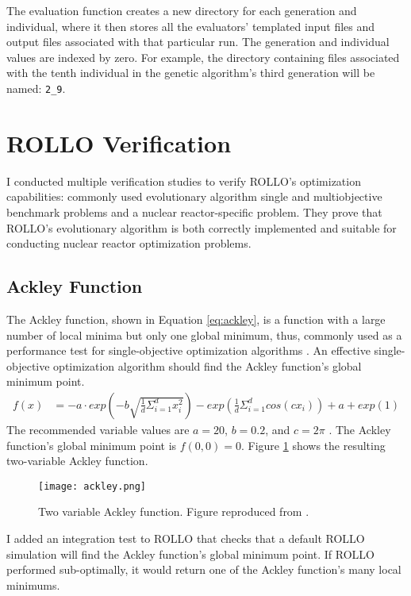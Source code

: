 The evaluation function creates a new directory for each generation and individual, 
where it then stores all the evaluators' templated input files and output files 
associated with that particular run. 
The generation and individual values are indexed by zero. 
For example, the directory containing files associated with the tenth individual in 
the genetic algorithm's third generation will be named: 
\texttt{2\_9}.


\section{ROLLO Verification}
\label{sec:rollo-verification}
I conducted multiple verification studies to verify \gls{ROLLO}'s optimization capabilities: 
commonly used evolutionary algorithm single and multiobjective benchmark problems and 
a nuclear reactor-specific problem. 
They prove that \gls{ROLLO}'s evolutionary algorithm is both correctly implemented 
and suitable for conducting nuclear reactor optimization problems. 

\subsection{Ackley Function}
The Ackley function, shown in Equation \ref{eq:ackley}, is a function with a 
large number of local minima but only one global minimum, thus, commonly used as a 
performance test for single-objective optimization algorithms 
\cite{ackley_connectionist_2012}. 
An effective single-objective optimization algorithm should find the Ackley function's 
global minimum point.  
\begin{align}
    \label{eq:ackley}
    f(x) &= -a \cdot exp \left(-b\sqrt{\frac{1}{d}\Sigma_{i=1}^dx_i^2}\right) - 
    exp \left(\frac{1}{d}\Sigma_{i=1}^d cos(cx_i)\right) + a + exp(1) 
\end{align}
The recommended variable values are $a=20$, $b=0.2$, and $c=2\pi$
\cite{sfu_ackley_nodate}. 
The Ackley function's global minimum point is $f(0,0) = 0$. 
Figure \ref{fig:ackley} shows the resulting two-variable Ackley function.
\begin{figure}[htbp]
    \centering
    \texttt{[image: ackley.png]} 
    \caption{Two variable Ackley function. Figure reproduced from \cite{sfu_ackley_nodate}.}
    \label{fig:ackley}
\end{figure}

I added an integration test to \gls{ROLLO} that checks that a default \gls{ROLLO} 
simulation will find the Ackley function's global minimum point. 
If \gls{ROLLO} performed sub-optimally, it would return one of the Ackley 
function's many local minimums. 

